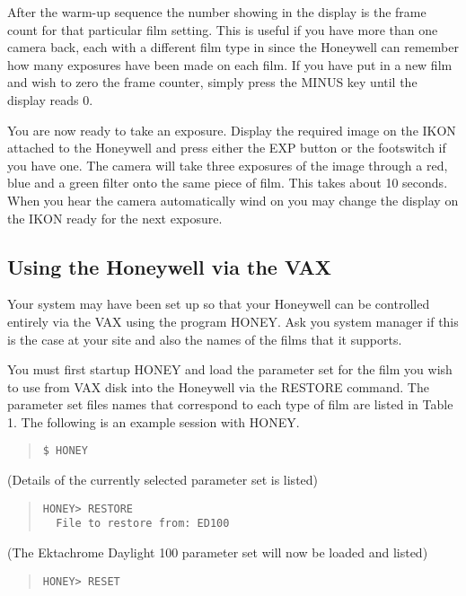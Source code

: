 After the warm-up sequence the number showing in the display is the frame count
for that particular film setting. This is useful if you have more than one
camera back, each  with a different film type in since the Honeywell can
remember how many exposures have been made on each film. If you have put in a 
new film and wish to zero the frame counter, simply press the MINUS key until
the display reads 0.

You are now ready to take an exposure. Display the required image on the
IKON  attached to the Honeywell and press either the EXP button or the
footswitch if you have one. The camera will take three exposures of the image
through a red, blue and a green filter onto the same piece of film. This takes
about 10 seconds. When you hear the camera automatically wind on you may
change the display on the IKON ready for the next exposure. 

\subsection{Using the Honeywell via the VAX}

Your system may have been set up so that your Honeywell can be controlled
entirely via the VAX using the program HONEY. Ask you system manager if this 
is the case at your site and also the names of the films that it supports. 

You must first startup HONEY and load the parameter set for the film
you wish to use from VAX disk into the Honeywell via the RESTORE command. The
parameter set files names that correspond to each type of film are listed in
Table 1. The following is an example session with HONEY.

\begin{quote}
\begin{verbatim}
$ HONEY
\end{verbatim}
\end{quote}
(Details of the currently selected parameter set is listed)

\begin{quote}
\begin{verbatim}
HONEY> RESTORE 
  File to restore from: ED100
\end{verbatim}
\end{quote}

(The Ektachrome Daylight 100 parameter set will now be loaded and listed)

\begin{quote}
\begin{verbatim}
HONEY> RESET
\end{verbatim}
\end{quote}

